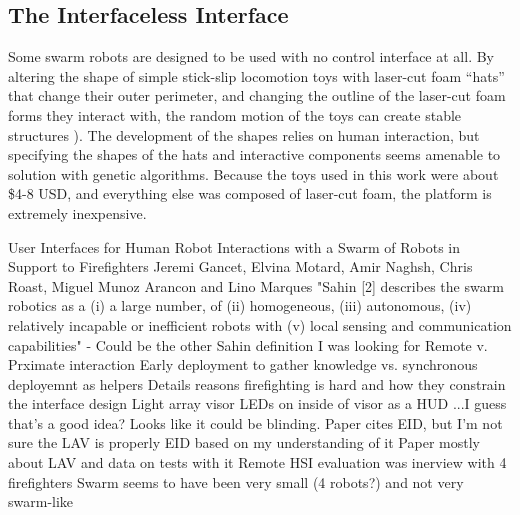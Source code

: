 \subsection{The Interfaceless Interface}	

Some swarm robots are designed to be used with no control interface at all.
By altering the shape of simple stick-slip locomotion toys with laser-cut foam ``hats'' that change their outer perimeter, and changing the outline of the laser-cut foam forms they interact with, the random motion of the toys can create stable structures \citep{andreen2016emergent}).
The development of the shapes relies on human interaction, but specifying the shapes of the hats and interactive components seems amenable to solution with genetic algorithms. 
Because the toys used in this work were about \$4-8 USD, and everything else was composed of laser-cut foam, the platform is extremely inexpensive. 

\citep{gancet2010user}
User Interfaces for Human Robot Interactions with a Swarm of Robots in Support to Firefighters
Jeremi Gancet, Elvina Motard, Amir Naghsh, Chris Roast, Miguel Munoz Arancon and Lino Marques
	"Sahin [2] describes the swarm robotics as a (i) a large number, of (ii) homogeneous, (iii) autonomous, (iv) relatively incapable or inefficient robots with (v) local sensing and communication capabilities" - Could be the other Sahin definition I was looking for
	Remote v. Prximate interaction
	Early deployment to gather knowledge vs. synchronous deployemnt as helpers
	Details reasons firefighting is hard and how they constrain the interface design
	Light array visor
		LEDs on inside of visor as a HUD
		...I guess that's a good idea? Looks like it could be blinding.
	Paper cites EID, but I'm not sure the LAV is properly EID based on my understanding of it
	Paper mostly about LAV and data on tests with it
		Remote HSI evaluation was inerview with 4 firefighters
		Swarm seems to have been very small (4 robots?) and not very swarm-like


